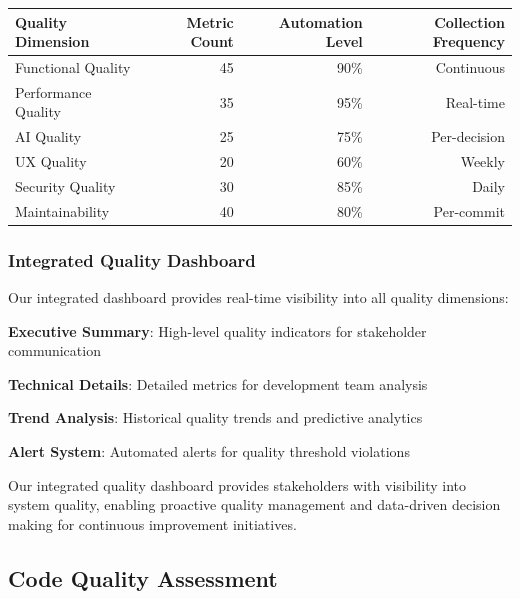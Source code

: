 \begin{center}
\begin{tabular}{@{}lrrr@{}}
\toprule
\textbf{Quality Dimension} & \textbf{Metric Count} & \textbf{Automation Level} & \textbf{Collection Frequency} \\
\midrule
Functional Quality & 45 & 90\% & Continuous \\
Performance Quality & 35 & 95\% & Real-time \\
AI Quality & 25 & 75\% & Per-decision \\
UX Quality & 20 & 60\% & Weekly \\
Security Quality & 30 & 85\% & Daily \\
Maintainability & 40 & 80\% & Per-commit \\
\bottomrule
\end{tabular}
\end{center}

\subsubsection*{Integrated Quality Dashboard}

Our integrated dashboard provides real-time visibility into all quality dimensions:

\begin{compactlist}
    \item \textbf{Executive Summary}: High-level quality indicators for stakeholder communication
    \item \textbf{Technical Details}: Detailed metrics for development team analysis
    \item \textbf{Trend Analysis}: Historical quality trends and predictive analytics
    \item \textbf{Alert System}: Automated alerts for quality threshold violations
\end{compactlist}

\begin{infobox}[title=Quality Dashboard Benefits]
Our integrated quality dashboard provides stakeholders with visibility into system quality, enabling proactive quality management and data-driven decision making for continuous improvement initiatives.
\end{infobox}

\subsection*{Code Quality Assessment}

